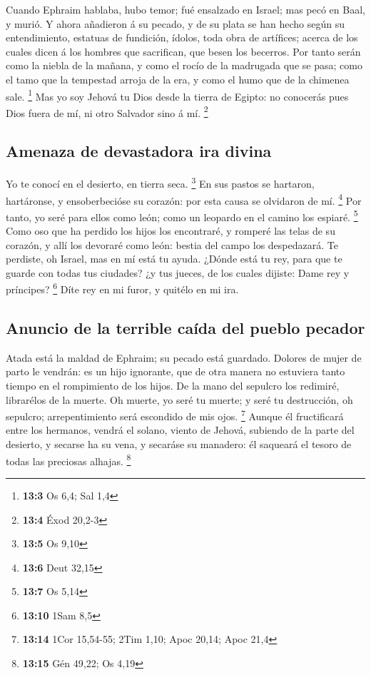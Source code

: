  Cuando Ephraim hablaba, hubo temor; fué ensalzado en
Israel; mas pecó en Baal, y murió.  Y ahora añadieron á su
pecado, y de su plata se han hecho según su entendimiento, estatuas de
fundición, ídolos, toda obra de artífices; acerca de los cuales dicen á
los hombres que sacrifican, que besen los becerros.  Por
tanto serán como la niebla de la mañana, y como el rocío de la madrugada
que se pasa; como el tamo que la tempestad arroja de la era, y como el
humo que de la chimenea sale. \footnote{\textbf{13:3} Os 6,4; Sal 1,4}
 Mas yo soy Jehová tu Dios desde la tierra de Egipto: no
conocerás pues Dios fuera de mí, ni otro Salvador sino á mí. \footnote{\textbf{13:4}
  Éxod 20,2-3}

\hypertarget{amenaza-de-devastadora-ira-divina}{%
\subsection{Amenaza de devastadora ira
divina}\label{amenaza-de-devastadora-ira-divina}}

 Yo te conocí en el desierto, en tierra seca. \footnote{\textbf{13:5}
  Os 9,10}  En sus pastos se hartaron, hartáronse, y
ensoberbecióse su corazón: por esta causa se olvidaron de mí.
\footnote{\textbf{13:6} Deut 32,15}  Por tanto, yo seré para
ellos como león; como un leopardo en el camino los espiaré. \footnote{\textbf{13:7}
  Os 5,14}  Como oso que ha perdido los hijos los
encontraré, y romperé las telas de su corazón, y allí los devoraré como
león: bestia del campo los despedazará.  Te perdiste, oh
Israel, mas en mí está tu ayuda.  ¿Dónde está tu rey, para
que te guarde con todas tus ciudades? ¿y tus jueces, de los cuales
dijiste: Dame rey y príncipes? \footnote{\textbf{13:10} 1Sam 8,5}
 Díte rey en mi furor, y quitélo en mi ira.

\hypertarget{anuncio-de-la-terrible-cauxedda-del-pueblo-pecador}{%
\subsection{Anuncio de la terrible caída del pueblo
pecador}\label{anuncio-de-la-terrible-cauxedda-del-pueblo-pecador}}

 Atada está la maldad de Ephraim; su pecado está guardado.
 Dolores de mujer de parto le vendrán: es un hijo
ignorante, que de otra manera no estuviera tanto tiempo en el
rompimiento de los hijos.  De la mano del sepulcro los
redimiré, librarélos de la muerte. Oh muerte, yo seré tu muerte; y seré
tu destrucción, oh sepulcro; arrepentimiento será escondido de mis ojos.
\footnote{\textbf{13:14} 1Cor 15,54-55; 2Tim 1,10; Apoc 20,14; Apoc 21,4}
 Aunque él fructificará entre los hermanos, vendrá el
solano, viento de Jehová, subiendo de la parte del desierto, y secarse
ha su vena, y secaráse su manadero: él saqueará el tesoro de todas las
preciosas alhajas. \footnote{\textbf{13:15} Gén 49,22; Os 4,19}

